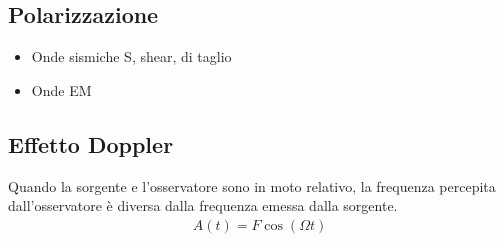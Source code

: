\documentclass[letterpaper,10pt,italian]{jupyterBook}
\begin{document}
\subsection{Polarizzazione}
\label{\detokenize{ch/waves/intro:polarizzazione}}\label{\detokenize{ch/waves/intro:physics-hs-waves-effects-polarization}}\begin{itemize}
\item {} 
\sphinxAtStartPar
Onde sismiche S, shear, di taglio

\item {} 
\sphinxAtStartPar
Onde EM

\end{itemize}


\subsection{Effetto Doppler}
\label{\detokenize{ch/waves/intro:effetto-doppler}}\label{\detokenize{ch/waves/intro:physics-hs-waves-effects-doppler}}
\sphinxAtStartPar
Quando la sorgente e l’osservatore sono in moto relativo, la frequenza percepita dall’osservatore è diversa dalla frequenza emessa dalla sorgente.
\begin{equation*}
\begin{split}A(t) = F \cos(\Omega t )\end{split}
\end{equation*}
\end{document}

